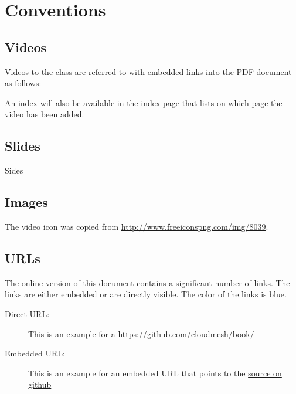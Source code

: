 \section{Conventions}

\subsection{Videos}

Videos to the class are referred to with embedded links into the PDF
document as follows: 


An index will also be available in the index page
that lists on which page the video has been added.

\subsection{Slides}

Sides

\subsection{Images}

The video icon was copied from \url{http://www.freeiconspng.com/img/8039}.

\subsection{URLs}

The online version of this document contains a significant number of
links. The links are either embedded or are directly visible. The
color of the links is blue.

\begin{description}
\item[Direct URL:] This is an example for a
  \url{https://github.com/cloudmesh/book/}
\item[Embedded URL:] This is an example for an embedded URL that
  points to the \href{https://github.com/cloudmesh/book/}{source on github}

\end{description}